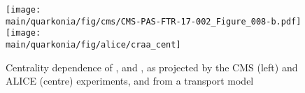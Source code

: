 \documentclass[../report.tex]{subfiles}
\providecommand{\main}{..}
\begin{document}
% 


\begin{figure}
\begin{center}
 \texttt{[image: \\main/quarkonia/fig/cms/CMS-PAS-FTR-17-002\_Figure\_008-b.pdf]}
 \texttt{[image: \\main/quarkonia/fig/alice/craa\_cent]}
\end{center}

 \caption{Centrality dependence of ,  and  \raa, as projected by the CMS\cite{CMS-PAS-FTR-17-002,Krouppa:2016jcl} (left) and ALICE (centre) experiments, and from a transport model\cite{Du:2017qkv}}
 \label{fig:upsi_raa_npart}
\end{figure}
\end{document}

